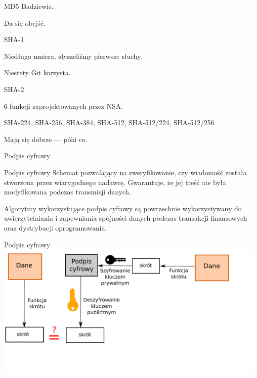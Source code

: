 \begin{frame}{MD5}
	Badziewie.
	
	Da się obejść.
\end{frame}

\begin{frame}{SHA-1}
	
	Niedługo umiera, słyszeliśmy pierwsze słuchy.
	
	Niestety Git korzysta.
	
\end{frame}

\begin{frame}{SHA-2}
	
	6 funkcji zaprojektowanych przez NSA.
	
	SHA-224, SHA-256, SHA-384, SHA-512, SHA-512/224, SHA-512/256
	
	Mają się dobrze --- póki co.
	
\end{frame}

\begin{frame}{Podpis cyfrowy}
	\begin{alertblock}{Podpis cyfrowy}
		Schemat pozwalający na zweryfikowanie, czy wiadomość została stworzona przez wiarygodnego nadawcę. Gwarantuje, że jej treść nie była modyfikowana podczas transmisji danych.
	\end{alertblock}	
	Algorytmy wykorzystujące podpis cyfrowy są powrzechnie wykorzystywany do uwierzytelniania i zapewniania spójności danych podczas transakcji finansowych oraz dystrybucji oprogramowania. 
\end{frame}

\begin{frame}{Podpis cyfrowy}
		\includegraphics[height=0.5\paperwidth]{images/dig-sign.pdf}
\end{frame}
